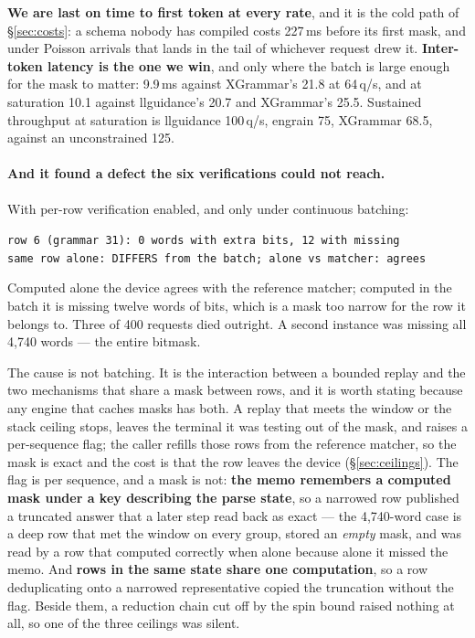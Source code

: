 \documentclass{article}
\begin{document}
\textbf{We are last on time to first token at every rate}, and it is the cold
path of \S\ref{sec:costs}: a schema nobody has compiled costs 227\,ms before
its first mask, and under Poisson arrivals that lands in the tail of whichever
request drew it. \textbf{Inter-token latency is the one we win}, and only where
the batch is large enough for the mask to matter: 9.9\,ms against XGrammar's
21.8 at 64\,q/s, and at saturation 10.1 against llguidance's 20.7 and
XGrammar's 25.5. Sustained throughput at saturation is llguidance 100\,q/s,
engrain 75, XGrammar 68.5, against an unconstrained 125.

\paragraph{And it found a defect the six verifications could not reach.} With
per-row verification enabled, and only under continuous batching:

\begin{center}
\begin{small}
\texttt{row 6 (grammar 31): 0 words with extra bits, 12 with missing}\\
\texttt{same row alone: DIFFERS from the batch; alone vs matcher: agrees}
\end{small}
\end{center}

Computed alone the device agrees with the reference matcher; computed in the
batch it is missing twelve words of bits, which is a mask too narrow for the
row it belongs to. Three of 400 requests died outright. A second instance was
missing all 4{,}740 words --- the entire bitmask.

The cause is not batching. It is the interaction between a bounded replay and
the two mechanisms that share a mask between rows, and it is worth stating
because any engine that caches masks has both. A replay that meets the window
or the stack ceiling stops, leaves the terminal it was testing out of the mask,
and raises a per-sequence flag; the caller refills those rows from the
reference matcher, so the mask is exact and the cost is that the row leaves the
device (\S\ref{sec:ceilings}). The flag is per sequence, and a mask is not:
\textbf{the memo remembers a computed mask under a key describing the parse
state}, so a narrowed row published a truncated answer that a later step read
back as exact --- the 4{,}740-word case is a deep row that met the window on
every group, stored an \emph{empty} mask, and was read by a row that computed
correctly when alone because alone it missed the memo. And \textbf{rows in the
same state share one computation}, so a row deduplicating onto a narrowed
representative copied the truncation without the flag. Beside them, a reduction
chain cut off by the spin bound raised nothing at all, so one of the three
ceilings was silent.
\end{document}
